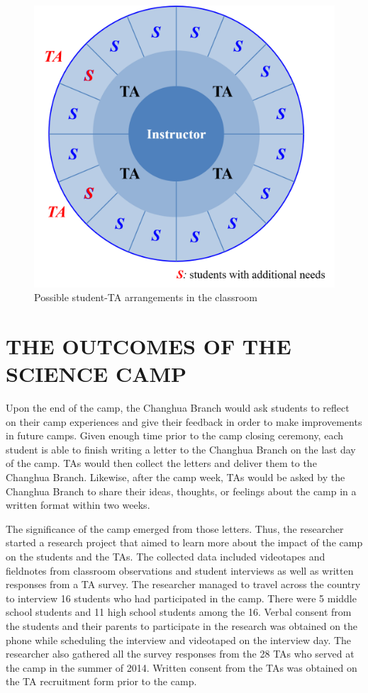 \documentclass[11.5pt]{sig-alternate} %
\begin{document}
\begin{large}
\begin{figure}[h]
    \centering
    \includegraphics[width=1\linewidth]{Fig5.png}
    \caption{Possible student-TA arrangements in the classroom}
\end{figure}

\section*{THE OUTCOMES OF THE SCIENCE CAMP}

Upon the end of the camp, the Changhua Branch would ask students to reflect on their camp experiences and give their feedback in order to make improvements in future camps. Given enough time prior to the camp closing ceremony, each student is able to finish writing a letter to the Changhua Branch on the last day of the camp. TAs would then collect the letters and deliver them to the Changhua Branch. Likewise, after the camp week, TAs would be asked by the Changhua Branch to share their ideas, thoughts, or feelings about the camp in a written format within two weeks.

The significance of the camp emerged from those letters. Thus, the researcher started a research project that aimed to learn more about the impact of the camp on the students and the TAs. The collected data included videotapes and fieldnotes from classroom observations and student interviews as well as written responses from a TA survey. The researcher managed to travel across the country to interview 16 students who had participated in the camp. There were 5 middle school students and 11 high school students among the 16. Verbal consent from the students and their parents to participate in the research was obtained on the phone while scheduling the interview and videotaped on the interview day. The researcher also gathered all the survey responses from the 28 TAs who served at the camp in the summer of 2014. Written consent from the TAs was obtained on the TA recruitment form prior to the camp. 


\end{large}
\end{document}
